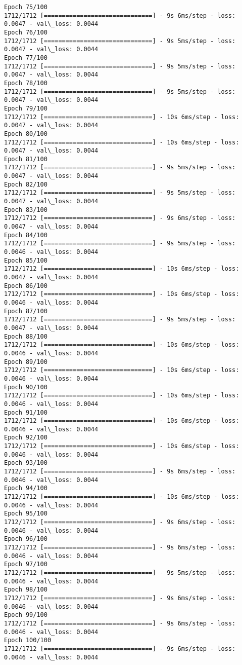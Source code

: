 \documentclass[11pt]{article}
\begin{document}
\begin{Verbatim}[commandchars=\\\{\}]
Epoch 75/100
1712/1712 [==============================] - 9s 6ms/step - loss: 0.0047 - val\_loss: 0.0044
Epoch 76/100
1712/1712 [==============================] - 9s 5ms/step - loss: 0.0047 - val\_loss: 0.0044
Epoch 77/100
1712/1712 [==============================] - 9s 5ms/step - loss: 0.0047 - val\_loss: 0.0044
Epoch 78/100
1712/1712 [==============================] - 9s 5ms/step - loss: 0.0047 - val\_loss: 0.0044
Epoch 79/100
1712/1712 [==============================] - 10s 6ms/step - loss: 0.0047 - val\_loss: 0.0044
Epoch 80/100
1712/1712 [==============================] - 10s 6ms/step - loss: 0.0047 - val\_loss: 0.0044
Epoch 81/100
1712/1712 [==============================] - 9s 5ms/step - loss: 0.0047 - val\_loss: 0.0044
Epoch 82/100
1712/1712 [==============================] - 9s 5ms/step - loss: 0.0047 - val\_loss: 0.0044
Epoch 83/100
1712/1712 [==============================] - 9s 6ms/step - loss: 0.0047 - val\_loss: 0.0044
Epoch 84/100
1712/1712 [==============================] - 9s 5ms/step - loss: 0.0046 - val\_loss: 0.0044
Epoch 85/100
1712/1712 [==============================] - 10s 6ms/step - loss: 0.0047 - val\_loss: 0.0044
Epoch 86/100
1712/1712 [==============================] - 10s 6ms/step - loss: 0.0046 - val\_loss: 0.0044
Epoch 87/100
1712/1712 [==============================] - 9s 5ms/step - loss: 0.0047 - val\_loss: 0.0044
Epoch 88/100
1712/1712 [==============================] - 10s 6ms/step - loss: 0.0046 - val\_loss: 0.0044
Epoch 89/100
1712/1712 [==============================] - 10s 6ms/step - loss: 0.0046 - val\_loss: 0.0044
Epoch 90/100
1712/1712 [==============================] - 10s 6ms/step - loss: 0.0046 - val\_loss: 0.0044
Epoch 91/100
1712/1712 [==============================] - 10s 6ms/step - loss: 0.0046 - val\_loss: 0.0044
Epoch 92/100
1712/1712 [==============================] - 10s 6ms/step - loss: 0.0046 - val\_loss: 0.0044
Epoch 93/100
1712/1712 [==============================] - 9s 6ms/step - loss: 0.0046 - val\_loss: 0.0044
Epoch 94/100
1712/1712 [==============================] - 10s 6ms/step - loss: 0.0046 - val\_loss: 0.0044
Epoch 95/100
1712/1712 [==============================] - 9s 6ms/step - loss: 0.0046 - val\_loss: 0.0044
Epoch 96/100
1712/1712 [==============================] - 9s 6ms/step - loss: 0.0046 - val\_loss: 0.0044
Epoch 97/100
1712/1712 [==============================] - 9s 5ms/step - loss: 0.0046 - val\_loss: 0.0044
Epoch 98/100
1712/1712 [==============================] - 9s 6ms/step - loss: 0.0046 - val\_loss: 0.0044
Epoch 99/100
1712/1712 [==============================] - 9s 6ms/step - loss: 0.0046 - val\_loss: 0.0044
Epoch 100/100
1712/1712 [==============================] - 9s 6ms/step - loss: 0.0046 - val\_loss: 0.0044

    \end{Verbatim}
\end{document}
